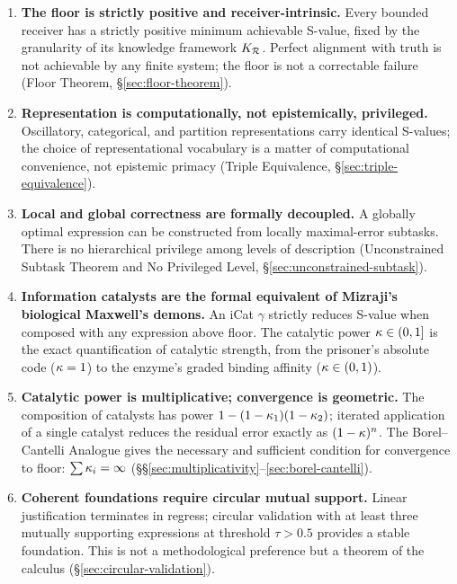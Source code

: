 \begin{enumerate}[label=(\arabic*), itemsep=4pt]

\item \textbf{The floor is strictly positive and receiver-intrinsic.} Every bounded receiver has a strictly positive minimum achievable S-value, fixed by the granularity of its knowledge framework $K_{\mathcal{R}}$. Perfect alignment with truth is not achievable by any finite system; the floor is not a correctable failure (Floor Theorem, \S\ref{sec:floor-theorem}).

\item \textbf{Representation is computationally, not epistemically, privileged.} Oscillatory, categorical, and partition representations carry identical S-values; the choice of representational vocabulary is a matter of computational convenience, not epistemic primacy (Triple Equivalence, \S\ref{sec:triple-equivalence}).

\item \textbf{Local and global correctness are formally decoupled.} A globally optimal expression can be constructed from locally maximal-error subtasks. There is no hierarchical privilege among levels of description (Unconstrained Subtask Theorem and No Privileged Level, \S\ref{sec:unconstrained-subtask}).

\item \textbf{Information catalysts are the formal equivalent of Mizraji's biological Maxwell's demons.} An iCat $\gamma$ strictly reduces S-value when composed with any expression above floor. The catalytic power $\kappa \in (0,1]$ is the exact quantification of catalytic strength, from the prisoner's absolute code ($\kappa = 1$) to the enzyme's graded binding affinity ($\kappa \in (0,1)$).

\item \textbf{Catalytic power is multiplicative; convergence is geometric.} The composition of catalysts has power $1-(1-\kappa_1)(1-\kappa_2)$; iterated application of a single catalyst reduces the residual error exactly as $(1-\kappa)^n$. The Borel--Cantelli Analogue gives the necessary and sufficient condition for convergence to floor: $\sum \kappa_i = \infty$ (\S\S\ref{sec:multiplicativity}--\ref{sec:borel-cantelli}).

\item \textbf{Coherent foundations require circular mutual support.} Linear justification terminates in regress; circular validation with at least three mutually supporting expressions at threshold $\tau > 0.5$ provides a stable foundation. This is not a methodological preference but a theorem of the calculus (\S\ref{sec:circular-validation}).

\end{enumerate}

